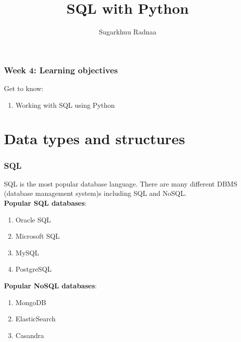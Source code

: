 \documentclass{beamer}
\title[Introduction to Python]{SQL with Python}
\author{Sugarkhuu Radnaa}
\institute[]
{
Py4Econ in Ulaanbaatar \\ 
\medskip
\textit{py4econ@gmail.com} 
}
\date{}  %
\begin{document}
\begin{frame}
\titlepage %
\end{frame}

\begin{frame}
    \frametitle{Week 4: Learning objectives}
    Get to know: 
    \begin{enumerate}
        \item Working with SQL using Python
    \end{enumerate}
\end{frame}

\section{Data types and structures} 

\begin{frame}
    \frametitle{SQL}
    SQL is the most popular database language. There are many different DBMS (database management system)s including SQL and NoSQL. \\
    \textbf{Popular SQL databases}:
    \begin{enumerate}
        \item Oracle SQL
        \item Microsoft SQL
        \item MySQL
        \item PostgreSQL
    \end{enumerate}    

    \textbf{Popular NoSQL databases}:
    \begin{enumerate}
        \item MongoDB
        \item ElasticSearch
        \item Casandra
    \end{enumerate}    
\end{frame}
\end{document}
